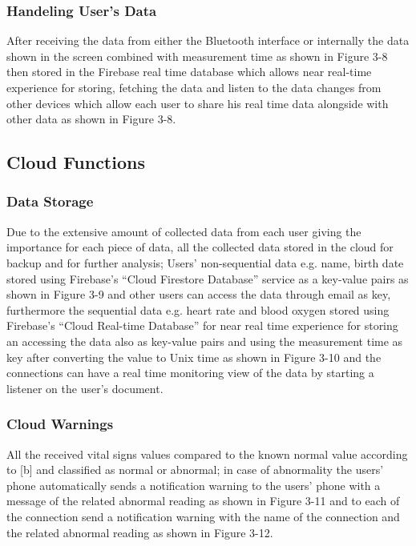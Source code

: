 \documentclass{bmcart}
\begin{document}
\subsubsection*{Handeling User's Data}
After receiving the data from either the Bluetooth interface or internally the
data shown in the screen combined with measurement time as shown in Figure 3-8
then stored in the Firebase real time database which allows near real-time
experience for storing, fetching the data and listen to the data changes from
other devices which allow each user to share his real time data alongside with
other data as shown in Figure 3-8.

\subsection*{Cloud Functions}
\subsubsection*{Data Storage}
Due to the extensive amount of collected data from each user giving the
importance for each piece of data, all the collected data stored in the cloud
for backup and for further analysis; Users’ non-sequential data e.g. name, birth
date  stored using Firebase’s “Cloud Firestore Database” service as a key-value
pairs as shown in Figure 3-9 and other users can access the data through email
as key, furthermore the sequential data e.g. heart rate and blood oxygen stored
using Firebase’s “Cloud Real-time Database” for near real time experience for
storing an accessing the data also as key-value pairs and using the measurement
time as key after converting the value to Unix time as shown in Figure 3-10 and
the connections can have a real time monitoring  view of the data by starting a
listener on the user’s document.
\subsubsection*{Cloud Warnings}
All the received vital signs values compared to the known normal value according
to [b] and classified as normal or abnormal; in case of abnormality the users’
phone automatically sends a notification warning to the users’ phone with a
message of the related abnormal reading as shown in Figure 3-11 and to each of
the connection send a notification warning with the name of the connection and
the related abnormal reading as shown in Figure 3-12.
\end{document}
